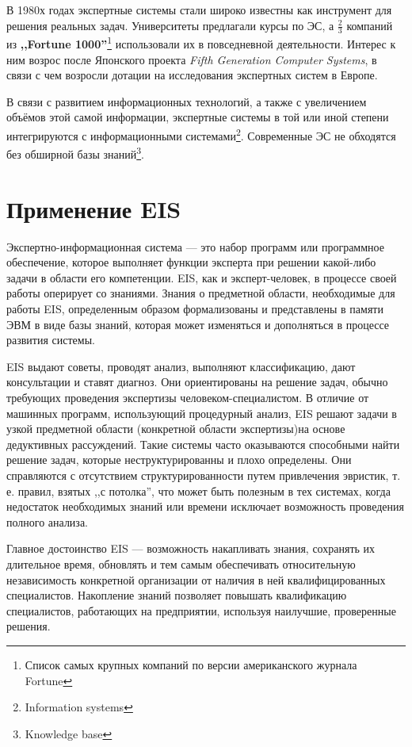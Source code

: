 \documentclass[a4paper,12pt,notitlepage,pdftex,headsepline]{scrartcl}
\begin{document}
  В 1980х годах экспертные системы стали широко известны как инструмент для
  решения реальных задач.
  Университеты предлагали курсы по ЭС, а \( \frac23 \) компаний из
  \textbf{,,Fortune 1000''}\footnote{Список самых крупных компаний по версии
  американского журнала Fortune} использовали их в повседневной деятельности.
  Интерес к ним возрос после Японского проекта \textit{Fifth Generation
  Computer Systems}, в связи с чем возросли дотации на исследования экспертных систем в
  Европе.

  В связи с развитием информационных технологий, а также с увеличением объёмов
  этой самой информации, экспертные системы в той или иной степени
  интегрируются с информационными системами\footnote{Information systems}.
  Современные ЭС не обходятся без обширной базы знаний\footnote{Knowledge
  base}.

\section{Применение EIS}
  Экспертно-информационная система --- это набор программ или программное
  обеспечение, которое выполняет функции эксперта при решении какой-либо
  задачи в области его компетенции.
  EIS, как и эксперт-человек, в процессе своей работы оперирует со знаниями.
  Знания о предметной области, необходимые для работы EIS, определенным образом
  формализованы и представлены в памяти ЭВМ в виде базы знаний, которая может
  изменяться и дополняться в процессе развития системы.

  EIS выдают советы, проводят анализ, выполняют классификацию, дают
  консультации и ставят диагноз.
  Они ориентированы на решение задач, обычно требующих проведения экспертизы
  человеком-специалистом.
  В отличие от машинных программ, использующий процедурный анализ, EIS решают
  задачи в узкой предметной области (конкретной области экспертизы)на основе
  дедуктивных рассуждений.
  Такие системы часто оказываются способными найти решение задач, которые
  неструктурированны и плохо определены.
  Они справляются с отсутствием структурированности путем привлечения
  эвристик, т.\,е. правил, взятых ,,с потолка'', что может быть полезным в тех
  системах, когда недостаток необходимых знаний или времени исключает
  возможность проведения полного анализа.

  Главное достоинство EIS --- возможность накапливать знания, сохранять их
  длительное время, обновлять и тем самым обеспечивать относительную
  независимость конкретной организации  от наличия в ней квалифицированных
  специалистов.
  Накопление знаний позволяет повышать квалификацию специалистов, работающих
  на предприятии, используя наилучшие, проверенные решения.
\end{document}
